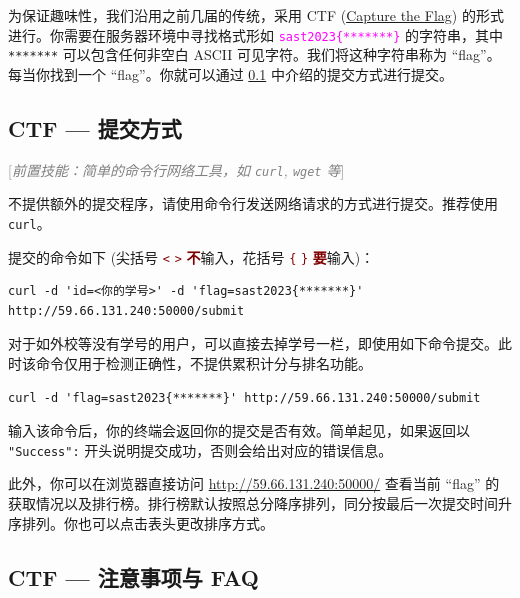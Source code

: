 \documentclass{article}
\begin{document}
	为保证趣味性，我们沿用之前几届的传统，采用 CTF (\href{https://en.wikipedia.org/wiki/Capture_the_flag_(cybersecurity)}{Capture the Flag}) 的形式进行。你需要在服务器环境中寻找格式形如 \textcolor{fuchsia}{\texttt{sast2023\{*******\}}} 的字符串，其中 \texttt{*******} 可以包含任何非空白 ASCII 可见字符。我们将这种字符串称为 ``flag''。每当你找到一个 ``flag''。你就可以通过 \ref{sss:ctfsubmit} 中介绍的提交方式进行提交。\cite{sast2022-linux}

	\subsection{CTF --- 提交方式}
	\label{sss:ctfsubmit}

	\textcolor{gray}{[\textit{前置技能：简单的命令行网络工具，如 \texttt{curl}, \texttt{wget} 等}]}

	不提供额外的提交程序，请使用命令行发送网络请求的方式进行提交。推荐使用 \texttt{curl}。

	提交的命令如下 (尖括号 \textcolor{maroon}{\texttt< \texttt> \textbf 不}输入，花括号 \textcolor{maroon}{\texttt\{ \texttt\} \textbf 要}输入)：

	\begin{verbatim}
curl -d 'id=<你的学号>' -d 'flag=sast2023{*******}' http://59.66.131.240:50000/submit
	\end{verbatim}

	\vspace{-6pt}
	对于如外校等没有学号的用户，可以直接去掉学号一栏，即使用如下命令提交。此时该命令仅用于检测正确性，不提供累积计分与排名功能。

	\begin{verbatim}
curl -d 'flag=sast2023{*******}' http://59.66.131.240:50000/submit
	\end{verbatim}

	\vspace{-6pt}
	输入该命令后，你的终端会返回你的提交是否有效。简单起见，如果返回以 \texttt{"Success":} 开头说明提交成功，否则会给出对应的错误信息。

	此外，你可以在浏览器直接访问 \url{http://59.66.131.240:50000/} 查看当前 ``flag'' 的获取情况以及排行榜。排行榜默认按照总分降序排列，同分按最后一次提交时间升序排列。你也可以点击表头更改排序方式。

	\subsection{CTF --- 注意事项与 FAQ}
\end{document}
